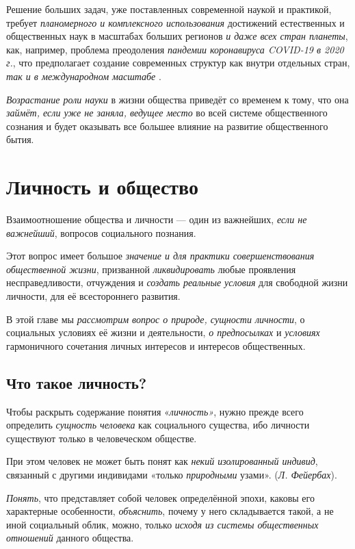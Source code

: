 \documentclass[a4paper,14pt,russian]{extreport}
\begin{document}
Решение больших задач, уже поставленных современной наукой и практикой, требует \emph{планомерного и комплексного использования} достижений естественных и общественных наук в масштабах больших регионов \emph{и даже всех стран планеты}, как, например, проблема преодоления \emph{пандемии коронавируса COVID-19 в 2020 г.}, что предполагает создание современных структур как внутри отдельных стран, \emph{так и в международном масштабе} .

\emph{Возрастание роли науки} в жизни общества приведёт со временем к тому, что она \emph{займёт, если уже не заняла, ведущее место} во всей системе общественного сознания и будет оказывать все большее влияние на развитие общественного бытия.

\section{Личность и общество}

Взаимоотношение общества и личности --- один из важнейших, \emph{если не важнейший}, вопросов социального познания.

Этот вопрос имеет большое \emph{значение и для практики совершенствования общественной жизни}, призванной \emph{ликвидировать} любые проявления несправедливости, отчуждения и \emph{создать реальные условия} для свободной жизни личности, для её всестороннего развития.

В этой главе мы \emph{рассмотрим вопрос о природе, сущности личности}, о социальных условиях её жизни и деятельности, \emph{о предпосылках} и \emph{условиях} гармоничного сочетания личных интересов и интересов общественных.

\subsection{Что такое личность?}

Чтобы раскрыть содержание понятия «\emph{личность»}, нужно прежде всего определить \emph{сущность человека} как социального существа, ибо личности существуют только в человеческом обществе.

При этом человек не может быть понят как \emph{некий изолированный индивид}, связанный с другими индивидами «только \emph{природными} узами». (\emph{Л. Фейербах}).

\emph{Понять}, что представляет собой человек определённой эпохи, каковы его характерные особенности, \emph{объяснить}, почему у него складывается такой, а не иной социальный облик, можно, только \emph{исходя из системы общественных отношений} данного общества.
\end{document}
